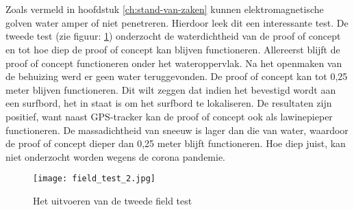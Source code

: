 \section{}
Zoals vermeld in hoofdstuk \ref{ch:stand-van-zaken} kunnen elektromagnetische golven water amper of niet penetreren. Hierdoor leek dit een interessante test.
\newline
De tweede test (zie figuur: \ref{fig:field_test_2}) onderzocht de waterdichtheid van de proof of concept en tot hoe diep de proof of concept kan blijven functioneren. Allereerst blijft de proof of concept functioneren onder het wateroppervlak. Na het openmaken van de behuizing werd er geen water teruggevonden.
\newline
De proof of concept kan tot 0,25 meter blijven functioneren. Dit wilt zeggen dat indien het bevestigd wordt aan een surfbord, het in staat is om het surfbord te lokaliseren. De resultaten zijn positief, want naast GPS-tracker kan de proof of concept ook als lawinepieper functioneren. De massadichtheid van sneeuw is lager dan die van water, waardoor de proof of concept dieper dan 0,25 meter blijft functioneren. Hoe diep juist, kan niet onderzocht worden wegens de corona pandemie. 
\begin{figure}
	\texttt{[image: field\_test\_2.jpg]}
	\caption{Het uitvoeren van de tweede field test}
	\label{fig:field_test_2}
\end{figure}